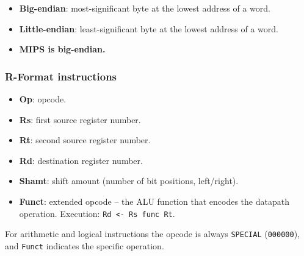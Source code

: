\begin{definition}[Endianness]
\leavevmode
\begin{itemize}
  \item \textbf{Big-endian}: most-significant byte at the lowest address of
  a word.
  \item \textbf{Little-endian}: least-significant byte at the lowest
  address of a word.
  \item \textbf{MIPS is big-endian.}
\end{itemize}
\end{definition}

\subsubsection{R-Format instructions}

\begin{center}
\end{center}

\begin{definition}
\leavevmode
\begin{itemize}
  \item \textbf{Op}: opcode.
  \item \textbf{Rs}: first source register number.
  \item \textbf{Rt}: second source register number.
  \item \textbf{Rd}: destination register number.
  \item \textbf{Shamt}: shift amount (number of bit positions, left/right).
  \item \textbf{Funct}: extended opcode -- the ALU function that encodes the
  datapath operation. Execution: \texttt{Rd <- Rs func Rt}.
\end{itemize}
\end{definition}

For arithmetic and logical instructions the opcode is always
\texttt{SPECIAL} (\texttt{000000}), and \texttt{Funct} indicates the
specific operation.

